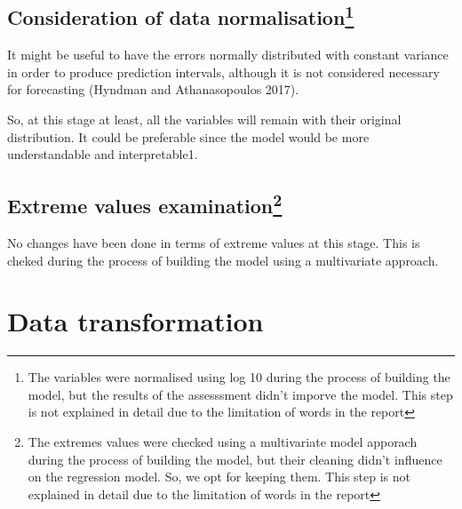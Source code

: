 \documentclass[11pt,]{article}
\newenvironment{Shaded}{\begin{snugshade}}{\end{snugshade}}
\newcommand{\KeywordTok}[1]{\textcolor[rgb]{0.13,0.29,0.53}{\textbf{{#1}}}}
\newcommand{\StringTok}[1]{\textcolor[rgb]{0.31,0.60,0.02}{{#1}}}
\newcommand{\CommentTok}[1]{\textcolor[rgb]{0.56,0.35,0.01}{\textit{{#1}}}}
\newcommand{\NormalTok}[1]{{#1}}
\let\rmarkdownfootnote\footnote%
\def\footnote{\protect\rmarkdownfootnote}
\begin{document}
\begin{Shaded}
\end{Shaded}

\subsection[Consideration of data
normalisation]{\texorpdfstring{Consideration of data
normalisation\footnote{The variables were normalised using log 10 during
  the process of building the model, but the results of the assesssment
  didn't imporve the model. This step is not explained in detail due to
  the limitation of words in the report}}{Consideration of data normalisation}}\label{consideration-of-data-normalisation}

It might be useful to have the errors normally distributed with constant
variance in order to produce prediction intervals, although it is not
considered necessary for forecasting (Hyndman and Athana­sopou­los
2017).

So, at this stage at least, all the variables will remain with their
original distribution. It could be preferable since the model would be
more understandable and interpretable1.

\subsection[Extreme values examination]{\texorpdfstring{Extreme values
examination\footnote{The extremes values were checked using a
  multivariate model apporach during the process of building the model,
  but their cleaning didn't influence on the regression model. So, we
  opt for keeping them. This step is not explained in detail due to the
  limitation of words in the report}}{Extreme values examination}}\label{extreme-values-examination}

No changes have been done in terms of extreme values at this stage. This
is cheked during the process of building the model using a multivariate
approach.

\section{Data transformation}\label{data-transformation}
\end{document}
